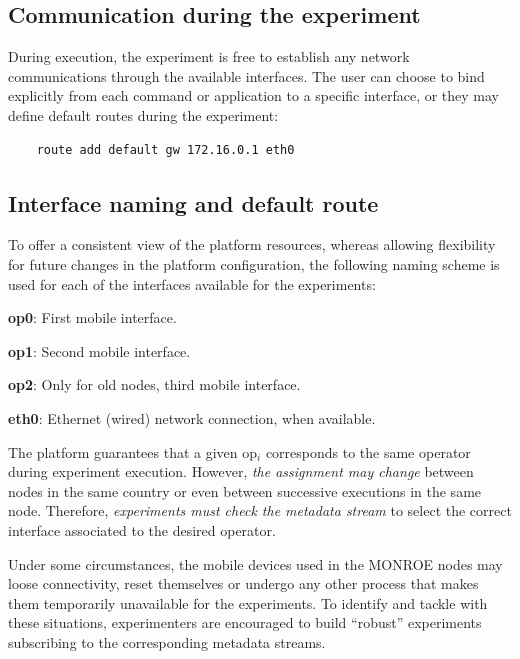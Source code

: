 \documentclass[a4paper,10pt]{article}
\newcommand{\VerbatimFont}{\footnotesize}
\newcommand{\monroe}{MONROE}
\begin{document}
\subsection{Communication during the experiment}
\label{subsec:communicationDuringExperiment}

During execution, the experiment is free to establish any network communications through the available interfaces.
The user can choose to bind explicitly from each command or application to a specific interface, or they may define default routes during the experiment:
{\VerbatimFont\begin{verbatim}
	route add default gw 172.16.0.1 eth0
\end{verbatim}}

\subsection{Interface naming and default route}
\label{subsec:interfaceNaming}

To offer a consistent view of the platform resources, whereas allowing flexibility for future changes in the platform configuration, the following naming scheme is used for each of the interfaces available for the experiments:
\begin{enumerate*}
	\item [\textbf{op0}:] First mobile interface.
	\item [\textbf{op1}:] Second mobile interface.
	\item [\textbf{op2}:] Only for old nodes, third mobile interface.
	\item [\textbf{eth0}:] Ethernet (wired) network connection, when available.
\end{enumerate*}
The platform guarantees that a given op$_i$ corresponds to the same operator during experiment execution.
However, \emph{the assignment may change} between nodes in the same country or even between successive executions in the same node.
Therefore, \emph{experiments must check the metadata stream} to select the correct interface associated to the desired operator.

Under some circumstances, the mobile devices used in the \monroe{} nodes may loose connectivity, reset themselves or undergo any other process that makes them temporarily unavailable for the experiments.
To identify and tackle with these situations, experimenters are encouraged to build ``robust'' experiments subscribing to the corresponding metadata streams.
\end{document}
